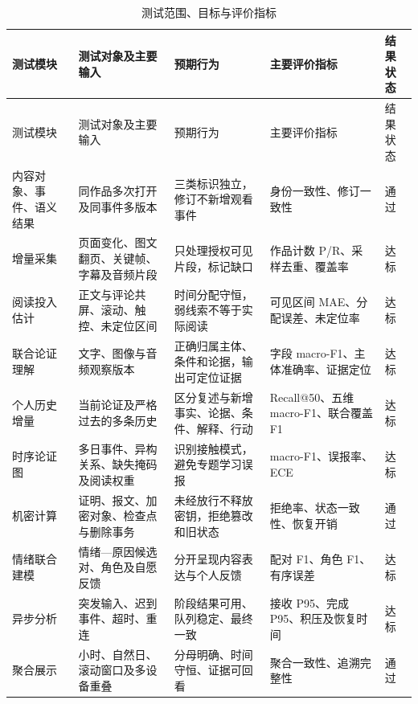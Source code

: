 \begin{longtable}[]{@{}
  >{\RaggedRight\arraybackslash}p{}
  >{\RaggedRight\arraybackslash}p{}
  >{\RaggedRight\arraybackslash}p{}
  >{\RaggedRight\arraybackslash}p{}
  >{\RaggedRight\arraybackslash}p{}@{}}
\caption{测试范围、目标与评价指标}\label{tab:3-1}\tabularnewline
\toprule\noalign{}
测试模块 & 测试对象及主要输入 & 预期行为 & 主要评价指标 & 结果状态 \\
\midrule\noalign{}
\endfirsthead
\toprule\noalign{}
测试模块 & 测试对象及主要输入 & 预期行为 & 主要评价指标 & 结果状态 \\
\midrule\noalign{}
\endhead
\bottomrule\noalign{}
\endlastfoot
内容对象、事件、语义结果 & 同作品多次打开及同事件多版本 & 三类标识独立，修订不新增观看事件 & 身份一致性、修订一致性 & 通过 \\
增量采集 & 页面变化、图文翻页、关键帧、字幕及音频片段 & 只处理授权可见片段，标记缺口 & 作品计数 P/R、采样去重、覆盖率 & 达标 \\
阅读投入估计 & 正文与评论共屏、滚动、触控、未定位区间 & 时间分配守恒，弱线索不等于实际阅读 & 可见区间 MAE、分配误差、未定位率 & 达标 \\
联合论证理解 & 文字、图像与音频观察版本 & 正确归属主体、条件和论据，输出可定位证据 & 字段 macro-F1、主体准确率、证据定位 & 达标 \\
个人历史增量 & 当前论证及严格过去的多条历史 & 区分复述与新增事实、论据、条件、解释、行动 & Recall@50、五维 macro-F1、联合覆盖 F1 & 达标 \\
时序论证图 & 多日事件、异构关系、缺失掩码及阅读权重 & 识别接触模式，避免专题学习误报 & macro-F1、误报率、ECE & 达标 \\
机密计算 & 证明、报文、加密对象、检查点与删除事务 & 未经放行不释放密钥，拒绝篡改和旧状态 & 拒绝率、状态一致性、恢复开销 & 通过 \\
情绪联合建模 & 情绪---原因候选对、角色及自愿反馈 & 分开呈现内容表达与个人反馈 & 配对 F1、角色 F1、有序误差 & 达标 \\
异步分析 & 突发输入、迟到事件、超时、重连 & 阶段结果可用、队列稳定、最终一致 & 接收 P95、完成 P95、积压及恢复时间 & 达标 \\
聚合展示 & 小时、自然日、滚动窗口及多设备重叠 & 分母明确、时间守恒、证据可回看 & 聚合一致性、追溯完整性 & 通过 \\
\end{longtable}

